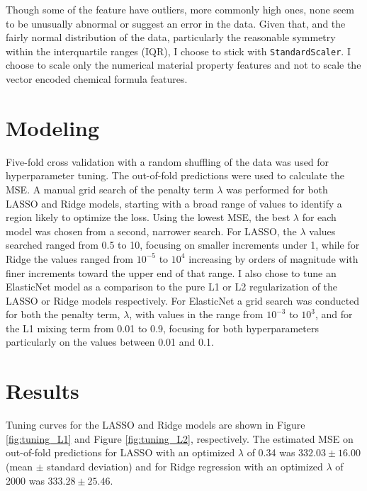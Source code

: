 \documentclass{article}      %
\begin{document}
Though some of the feature have outliers, more commonly high ones, none seem to be unusually abnormal or suggest an error in the data. Given that, and the fairly normal distribution of the data, particularly the reasonable symmetry within the interquartile ranges (IQR), I choose to stick with \texttt{StandardScaler}. I choose to scale only the numerical material property features and not to scale the vector encoded chemical formula features.

\section{Modeling}
Five-fold cross validation with a random shuffling of the data was used for hyperparameter tuning. The out-of-fold predictions were used to calculate the MSE. A manual grid search of the penalty term \(\lambda \) was performed for both LASSO and Ridge models, starting with a broad range of values to identify a region likely to optimize the loss. Using the lowest MSE, the best \(\lambda \) for each model was chosen from a second, narrower search. For LASSO, the \(\lambda \) values searched ranged from 0.5 to 10, focusing on smaller increments under 1, while for Ridge the values ranged from \(10^{-5}\) to \(10^{4}\) increasing by orders of magnitude with finer increments toward the upper end of that range.
I also chose to tune an ElasticNet model as a comparison to the pure L1 or L2 regularization of the LASSO or Ridge models respectively. For ElasticNet a grid search was conducted for both the penalty term, \(\lambda \), with values in the range from  \(10^{-3}\) to \(10^{3}\), and for the L1 mixing term from 0.01 to 0.9, focusing for both hyperparameters particularly on the values between 0.01 and 0.1.

\section{Results}

Tuning curves for the LASSO and Ridge models are shown in Figure \ref{fig:tuning_L1} and Figure \ref{fig:tuning_L2}, respectively. The estimated MSE on out-of-fold predictions for LASSO with an optimized \(\lambda \) of 0.34 was \( 332.03 \pm 16.00 \) (mean \(\pm\) standard deviation) and for Ridge regression with an optimized \(\lambda \) of 2000 was \( 333.28 \pm 25.46 \). 
\end{document}

